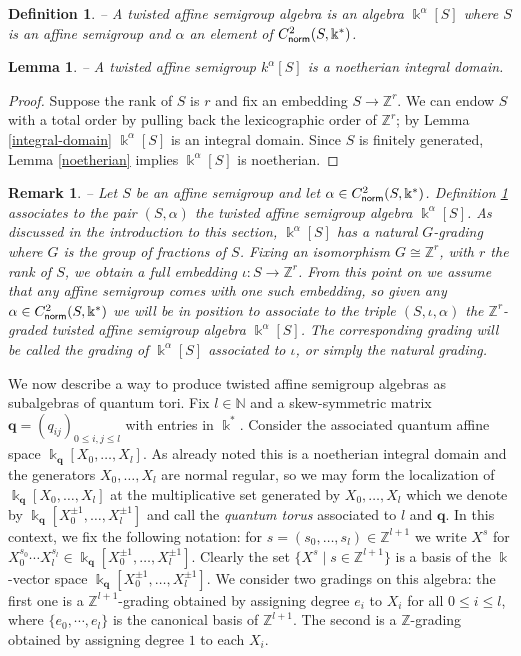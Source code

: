 \documentclass[twoside,11pt]{article}
\newcommand{\norm}{{\sf norm}}
\renewcommand{\k}{\Bbbk}
\newcommand{\N}{{\mathbb N}}
\newcommand{\Z}{{\mathbb Z}}
\newcommand{\q}{{\mathbf q}}
\newtheorem{subdefinition}[subtheorem]{Definition}
\newtheorem{sublemma}[subtheorem]{Lemma}
\newtheorem{subremark}[subtheorem]{Remark}
\begin{document}
\begin{subdefinition} -- \label{def-tasa}
A twisted affine semigroup algebra is an algebra $\k^\alpha[S]$ where $S$ is an 
affine semigroup and $\alpha$ an element of $C^2_\norm(S,\k^*)$.
\end{subdefinition}

\begin{sublemma} -- \label{integre-et-noetherien}
A twisted affine semigroup $k^\alpha[S]$ is a noetherian integral domain.
\end{sublemma}

\begin{proof} Suppose the rank of $S$ is $r$ and fix an embedding $S \to \Z^r$. We can
endow $S$ with a total order by pulling back the lexicographic order of $\Z^r$; by Lemma
\ref{integral-domain} $\k^\alpha[S]$ is an integral domain. Since $S$ is finitely
generated, Lemma \ref{noetherian} implies $\k^\alpha[S]$ is noetherian. \end{proof}

\begin{subremark} -- \label{rmk-grading-tasa} \rm
Let $S$ be an affine semigroup and let $\alpha \in C^2_\norm(S,\k^*)$. 
Definition \ref{def-tasa} associates to the pair $(S,\alpha)$ the twisted affine semigroup
algebra $\k^\alpha[S]$. As discussed in the introduction to this section, $\k^\alpha[S]$
has a natural $G$-grading where $G$ is the group of fractions of $S$. Fixing an
isomorphism $G \cong \Z^r$, with $r$ the rank of $S$, we obtain a full embedding $\iota: S
\to \Z^r$. From this point on we assume that any affine semigroup comes with one such
embedding, so given any $\alpha \in C^2_\norm(S,\k^*)$ we will be in
position to associate to the triple $(S,\iota,\alpha)$ the $\Z^r$-graded twisted affine
semigroup algebra $\k^\alpha[S]$. The corresponding grading will be called the grading of
$\k^\alpha[S]$ associated to $\iota$, or simply the natural grading.
\end{subremark}

We now describe a way to produce twisted affine semigroup algebras as subalgebras of
quantum tori. Fix $l\in\N$ and a skew-symmetric matrix $\q=(q_{ij})_{0\le i,j \le l}$ with
entries in $\k^*$. Consider the associated quantum affine space $\k_\q[X_0,\dots,X_l]$.
As already noted this is a noetherian integral domain and the generators $X_0,\dots,X_l$
are normal regular, so we may form the localization of $\k_\q[X_0,\dots,X_l]$ at the
multiplicative set generated by $X_0,\dots,X_l$ which we denote by $\k_\q[X_0^{\pm
1},\dots,X_l^{\pm 1}]$ and call the \emph{quantum torus} associated to $l$ and $\q$. In
this context, we fix the following notation: for $s=(s_0,\dots,s_l) \in\Z^{l+1}$ we write
$X^s$ for $X_0^{s_0} \cdots X_l^{s_l} \in \k_\q[X_0^{\pm 1},\dots,X_l^{\pm 1}]$. Clearly
the set $\{X^s \mid s\in\Z^{l+1}\}$ is a basis of the $\k$-vector space $\k_\q[X_0^{\pm
1},\dots,X_l^{\pm 1}]$. We consider two gradings on this algebra: the first one is a
$\Z^{l+1}$-grading obtained by assigning degree $e_i$ to $X_i$ for all $0 \le i \le l$,
where $\{e_0,\cdots,e_l\}$ is the canonical basis of $\Z^{l+1}$. The second is a
$\Z$-grading obtained by assigning degree $1$ to each $X_i$. 
\end{document}
